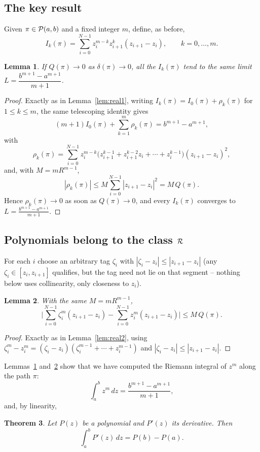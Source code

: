 \documentclass[11pt,fleqn]{article}
\def\ds{\displaystyle}
\theoremstyle{plain}
\newtheorem{thm}{Theorem}[section]
\newtheorem{lemma}[thm]{Lemma}
\theoremstyle{remark}
\begin{document}
\subsection{The key result}

Given $\pi\in{\cal P}(a,b)$ and a fixed integer $m$, define, as before,
\[
I_k(\pi)=\ds\sum_{i=0}^{N-1}z_i^{m-k}z_{i+1}^k(z_{i+1}-z_i),\qquad k=0,\ldots,m.
\]

\begin{lemma}\label{lem:cplx1}
If $Q(\pi)\to0$ as $\delta(\pi)\to0$, all the $I_k(\pi)$ tend to the same
limit $L=\dfrac{b^{m+1}-a^{m+1}}{m+1}$.
\end{lemma}
\begin{proof}
Exactly as in Lemma~\ref{lem:real1}, writing $I_k(\pi)=I_0(\pi)+\rho_k(\pi)$
for $1\le k\le m$, the same telescoping identity gives
\[
(m+1)I_0(\pi)+\sum_{k=1}^m\rho_k(\pi)=b^{m+1}-a^{m+1},
\]
with
\[
\rho_k(\pi)=\sum_{i=0}^{N-1}z_i^{m-k}\big(z_{i+1}^{k-1}+z_{i+1}^{k-2}z_i+\cdots+z_i^{k-1}\big)(z_{i+1}-z_i)^2,
\]
and, with $M=mR^{m-1}$,
\[
|\rho_k(\pi)|\le M\sum_{i=0}^{N-1}|z_{i+1}-z_i|^2=M\,Q(\pi).
\]
Hence $\rho_k(\pi)\to0$ as soon as $Q(\pi)\to0$, and every
$I_k(\pi)$ converges to $L=\frac{b^{m+1}-a^{m+1}}{m+1}$.
\end{proof}

\subsection{Polynomials belong to the class ${\cal R}$}

For each $i$ choose an arbitrary tag $\zeta_i$ with
$|\zeta_i-z_i|\le|z_{i+1}-z_i|$ (any $\zeta_i\in[z_i,z_{i+1}]$ qualifies,
but the tag need not lie on that segment -- nothing below uses
collinearity, only closeness to $z_i$).

\begin{lemma}\label{lem:cplx2}
With the same $M=mR^{m-1}$,
\[
\Big|\sum_{i=0}^{N-1}\zeta_i^m(z_{i+1}-z_i)-\sum_{i=0}^{N-1}z_i^m(z_{i+1}-z_i)\Big|
\le M\,Q(\pi).
\]
\end{lemma}
\begin{proof}
Exactly as in Lemma~\ref{lem:real2}, using
$\zeta_i^m-z_i^m=(\zeta_i-z_i)(\zeta_i^{m-1}+\cdots+z_i^{m-1})$ and
$|\zeta_i-z_i|\le|z_{i+1}-z_i|$.
\end{proof}

Lemmas~\ref{lem:cplx1} and~\ref{lem:cplx2} show that we have computed the
Riemann integral of $z^m$ along the path $\pi$:
\[
\int_a^b z^m\,dz=\frac{b^{m+1}-a^{m+1}}{m+1},
\]
and, by linearity,
\begin{thm}\label{thm:cplx}
Let $P(z)$ be a polynomial and $P'(z)$ its derivative. Then
\[
\int_a^b P'(z)\,dz=P(b)-P(a).
\]
\end{thm}
\end{document}

